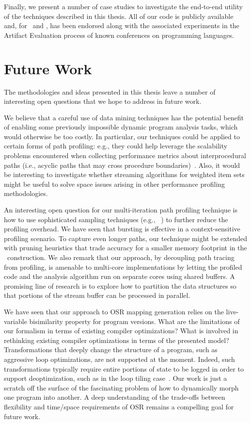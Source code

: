 Finally, we present a number of case studies to investigate the end-to-end utility of the techniques described in this thesis. All of our code is publicly available and, for \kblpp\ and \osrkit, has been endorsed along with the associated experiments in the Artifact Evaluation process of known conferences on programming languages.

\section*{Future Work}
The methodologies and ideas presented in this thesis leave a number of interesting open questions that we hope to address in future work.

We believe that a careful use of data mining techniques has the potential benefit of enabling some previously impossible dynamic program analysis tasks, which would otherwise be too costly. In particular, our techniques could be applied to certain forms of path profiling: e.g., they could help leverage the scalability problems encountered when collecting performance metrics about interprocedural paths (i.e., acyclic paths that may cross procedure boundaries)~\cite{Melski99}. Also, it would be interesting to investigate whether streaming algorithms for weighted item sets might be useful to solve space issues arising in other performance profiling methodologies.

\noindent An interesting open question for our multi-iteration path profiling technique is how to use sophisticated sampling techniques (e.g., ~\cite{Arnold01,Zhuang06}) to further reduce the profiling overhead. We have seen that bursting is effective in a context-sensitive profiling scenario. To capture even longer paths, our technique might be extended with pruning heuristics that trade accuracy for a smaller memory footprint in the \ksf\ construction. We also remark that our approach, by decoupling path tracing from profiling, is amenable to multi-core implementations by letting the profiled code and the analysis algorithm run on separate cores using shared buffers. A promising line of research is to explore how to partition the data structures so that portions of the stream buffer can be processed in parallel.

We have seen that our approach to OSR mapping generation relies on the live-variable bisimilarity property for program versions. What are the limitations of our formalism in terms of existing compiler optimizations? What is involved in rethinking existing compiler optimizations in terms of the presented model? Transformations that deeply change the structure of a program, such as aggressive loop optimizations, are not supported at the moment. Indeed, such transformations typically require entire portions of state to be logged in order to support deoptimization, such as in the loop tiling case~\cite{Bhandari15}. Our work is just a scratch off the surface of the fascinating problem of how to dynamically morph one program into another. A deep understanding of the trade-offs between flexibility and time/space requirements of OSR remains a compelling goal for future work.

